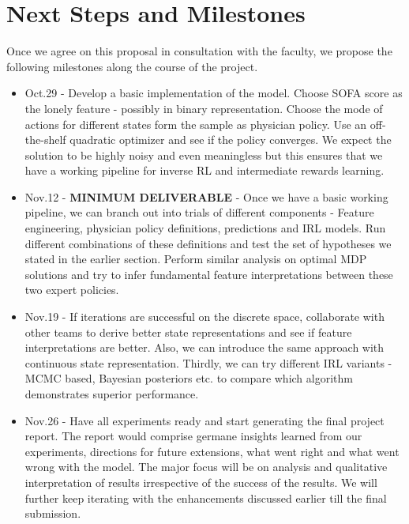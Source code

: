 \documentclass[twoside,11pt]{article}
\begin{document}
\section{Next Steps and Milestones}
Once we agree on this proposal in consultation with the faculty, we propose the following milestones along the course of the project.
\begin{itemize}
\item Oct.29 - Develop a basic implementation of the model. Choose SOFA score as the lonely feature - possibly in binary representation. Choose the mode of actions for different states form the sample as physician policy. Use an off-the-shelf quadratic optimizer and see if the policy converges. We expect the solution to be highly noisy and even meaningless but this ensures that we have a working pipeline for inverse RL and intermediate rewards learning.
\item Nov.12 - \textbf{MINIMUM DELIVERABLE} - Once we have a basic working pipeline, we can branch out into trials of different components - Feature engineering, physician policy definitions, predictions and IRL models. Run different combinations of these definitions and test the set of hypotheses we stated in the earlier section. Perform similar analysis on optimal MDP solutions and try to infer fundamental feature interpretations between these two expert policies.
\item Nov.19 - If iterations are successful on the discrete space, collaborate with other teams to derive  better state representations and see if feature interpretations are better. Also, we can introduce the same approach with continuous state representation. Thirdly, we can try different IRL variants - MCMC based, Bayesian posteriors etc. to compare which algorithm demonstrates superior performance.
\item Nov.26 - Have all experiments ready and start generating the final project report. The report would comprise germane insights learned from our experiments, directions for future extensions, what went right and what went wrong with the model. The major focus will be on analysis and qualitative interpretation of results irrespective of the success of the results. We will further keep iterating with the enhancements discussed earlier till the final submission.
\end{itemize} 








\end{document}
